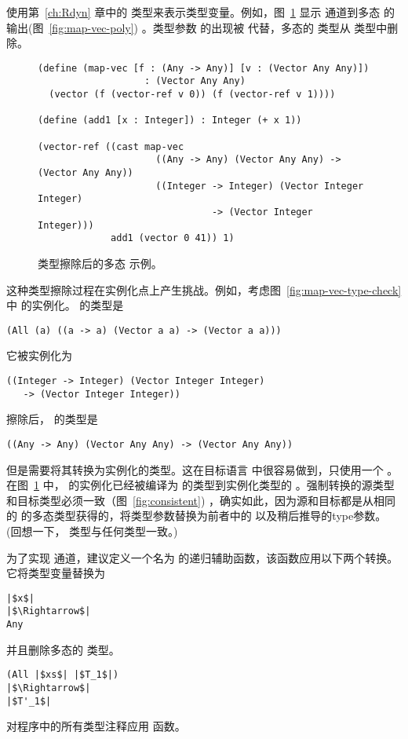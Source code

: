 \documentclass[11pt]{book}
\begin{document}
使用第~\ref{ch:Rdyn} 章中的
 类型来表示类型变量。例如，图~\ref{fig:map-vec-erase}
显示  通道到多态
 的输出(图~\ref{fig:map-vec-poly}) 。类型参数  的出现被  代替，多态的
 类型从  类型中删除。

\begin{figure}[tbp]
\begin{lstlisting}
(define (map-vec [f : (Any -> Any)] [v : (Vector Any Any)])
                   : (Vector Any Any)
  (vector (f (vector-ref v 0)) (f (vector-ref v 1))))

(define (add1 [x : Integer]) : Integer (+ x 1))

(vector-ref ((cast map-vec
                     ((Any -> Any) (Vector Any Any) -> (Vector Any Any))  
                     ((Integer -> Integer) (Vector Integer Integer)
                               -> (Vector Integer Integer)))
             add1 (vector 0 41)) 1)
\end{lstlisting}
\caption{类型擦除后的多态  示例。}
\label{fig:map-vec-erase}
\end{figure}

这种类型擦除过程在实例化点上产生挑战。例如，考虑图~\ref{fig:map-vec-type-check} 中  的实例化。
  的类型是
\begin{lstlisting}
(All (a) ((a -> a) (Vector a a) -> (Vector a a)))
\end{lstlisting}
它被实例化为
\begin{lstlisting}
((Integer -> Integer) (Vector Integer Integer)
   -> (Vector Integer Integer))
\end{lstlisting}
擦除后，  的类型是
\begin{lstlisting}
((Any -> Any) (Vector Any Any) -> (Vector Any Any))
\end{lstlisting}
但是需要将其转换为实例化的类型。这在目标语言 \LangCast{} 中很容易做到，只使用一个  。在图~\ref{fig:map-vec-erase} 中， 
的实例化已经被编译为  的类型到实例化类型的
 。强制转换的源类型和目标类型必须一致（图~\ref{fig:consistent}) ，确实如此，因为源和目标都是从相同的  的多态类型获得的，将类型参数替换为前者中的
 以及稍后推导的type参数。 (回想一下，  类型与任何类型一致。)

为了实现  通道，建议定义一个名为  的递归辅助函数，该函数应用以下两个转换。它将类型变量替换为 
\begin{lstlisting}
|$x$|
|$\Rightarrow$|
Any
\end{lstlisting}
并且删除多态的  类型。
\begin{lstlisting}
(All |$xs$| |$T_1$|)
|$\Rightarrow$|
|$T'_1$|
\end{lstlisting}
对程序中的所有类型注释应用  函数。
\end{document}
